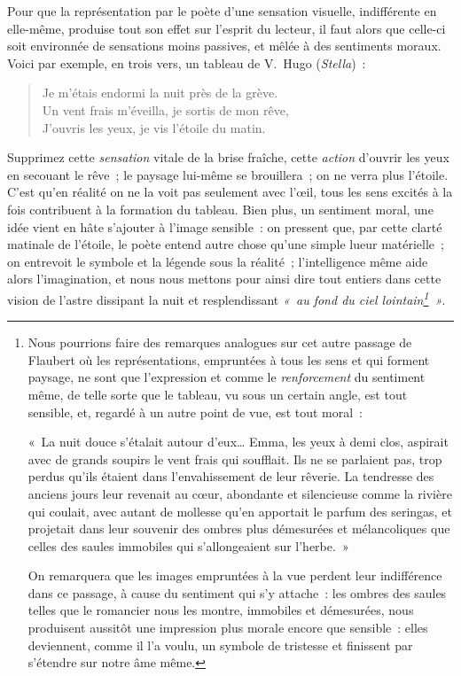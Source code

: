 \documentclass[french,twoside]{book} %
\begin{document}
\noindent Pour que la représentation par le poète d’une sensation visuelle, indifférente en elle-même, produise tout son effet sur l’esprit du lecteur, il faut alors que celle-ci soit environnée de sensations moins passives, et mêlée à des sentiments moraux. Voici par exemple, en trois vers, un tableau de V. Hugo (\emph{Stella}) :\par


\begin{verse}
Je m’étais endormi la nuit près de la grève.\\
Un vent frais m’éveilla, je sortis de mon rêve,\\
J’ouvris les yeux, je vis l’étoile du matin.\\
\end{verse}

\noindent  Supprimez cette \emph{sensation} vitale de la brise fraîche, cette \emph{action} d’ouvrir les yeux en secouant le rêve ; le paysage lui-même se brouillera ; on ne verra plus l’étoile. C’est qu’en réalité on ne la voit pas seulement avec l’œil, tous les sens excités à la fois contribuent à la formation du tableau. Bien plus, un sentiment moral, une idée vient en hâte s’ajouter à l’image sensible : on pressent que, par cette clarté matinale de l’étoile, le poète entend autre chose qu’une simple lueur matérielle ; on entrevoit le symbole et la légende sous la réalité ; l’intelligence même aide alors l’imagination, et nous nous mettons pour ainsi dire tout entiers dans cette vision de l’astre dissipant la nuit et resplendissant \emph{« au fond du ciel lointain\footnote{\noindent Nous pourrions faire des remarques analogues sur cet autre passage de Flaubert où les représentations, empruntées à tous les sens et qui forment paysage, ne sont que l’expression et comme le \emph{renforcement} du sentiment même, de telle sorte que le tableau, vu sous un certain angle, est tout sensible, et, regardé à un autre point de vue, est tout moral :\par
\noindent « La nuit douce s’étalait autour d’eux… Emma, les yeux à demi clos, aspirait avec de grands soupirs le vent frais qui soufflait. Ils ne se parlaient pas, trop perdus qu’ils étaient dans l’envahissement de leur rêverie. La tendresse des anciens jours leur revenait au cœur, abondante et silencieuse comme la rivière qui coulait, avec autant de mollesse qu’en apportait le parfum des seringas, et projetait dans leur souvenir des ombres plus démesurées et mélancoliques que celles des saules immobiles qui s’allongeaient sur l’herbe. »
\par
\noindent On remarquera que les images empruntées à la vue perdent leur indifférence dans ce passage, à cause du sentiment qui s’y attache : les ombres des saules telles que le romancier nous les montre, immobiles et démesurées, nous produisent aussitôt une impression plus morale encore que sensible : elles deviennent, comme il l’a voulu, un symbole de tristesse et finissent par s’étendre sur notre âme même.
} »}.\par
\end{document}
